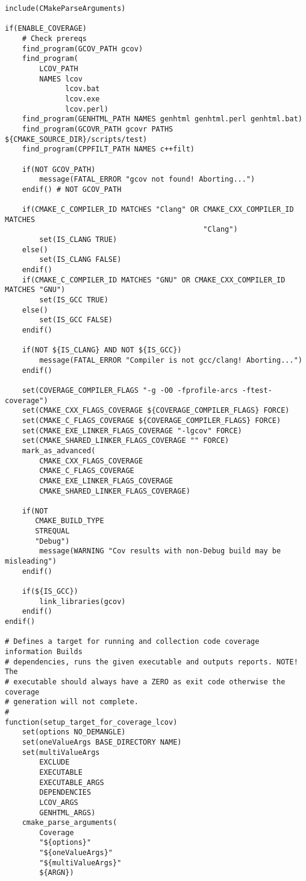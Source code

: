 \begin{verbatim}
include(CMakeParseArguments)

if(ENABLE_COVERAGE)
    # Check prereqs
    find_program(GCOV_PATH gcov)
    find_program(
        LCOV_PATH
        NAMES lcov
              lcov.bat
              lcov.exe
              lcov.perl)
    find_program(GENHTML_PATH NAMES genhtml genhtml.perl genhtml.bat)
    find_program(GCOVR_PATH gcovr PATHS ${CMAKE_SOURCE_DIR}/scripts/test)
    find_program(CPPFILT_PATH NAMES c++filt)

    if(NOT GCOV_PATH)
        message(FATAL_ERROR "gcov not found! Aborting...")
    endif() # NOT GCOV_PATH

    if(CMAKE_C_COMPILER_ID MATCHES "Clang" OR CMAKE_CXX_COMPILER_ID MATCHES
                                              "Clang")
        set(IS_CLANG TRUE)
    else()
        set(IS_CLANG FALSE)
    endif()
    if(CMAKE_C_COMPILER_ID MATCHES "GNU" OR CMAKE_CXX_COMPILER_ID MATCHES "GNU")
        set(IS_GCC TRUE)
    else()
        set(IS_GCC FALSE)
    endif()

    if(NOT ${IS_CLANG} AND NOT ${IS_GCC})
        message(FATAL_ERROR "Compiler is not gcc/clang! Aborting...")
    endif()

    set(COVERAGE_COMPILER_FLAGS "-g -O0 -fprofile-arcs -ftest-coverage")
    set(CMAKE_CXX_FLAGS_COVERAGE ${COVERAGE_COMPILER_FLAGS} FORCE)
    set(CMAKE_C_FLAGS_COVERAGE ${COVERAGE_COMPILER_FLAGS} FORCE)
    set(CMAKE_EXE_LINKER_FLAGS_COVERAGE "-lgcov" FORCE)
    set(CMAKE_SHARED_LINKER_FLAGS_COVERAGE "" FORCE)
    mark_as_advanced(
        CMAKE_CXX_FLAGS_COVERAGE
        CMAKE_C_FLAGS_COVERAGE
        CMAKE_EXE_LINKER_FLAGS_COVERAGE
        CMAKE_SHARED_LINKER_FLAGS_COVERAGE)

    if(NOT
       CMAKE_BUILD_TYPE
       STREQUAL
       "Debug")
        message(WARNING "Cov results with non-Debug build may be misleading")
    endif()

    if(${IS_GCC})
        link_libraries(gcov)
    endif()
endif()

# Defines a target for running and collection code coverage information Builds
# dependencies, runs the given executable and outputs reports. NOTE! The
# executable should always have a ZERO as exit code otherwise the coverage
# generation will not complete.
#
function(setup_target_for_coverage_lcov)
    set(options NO_DEMANGLE)
    set(oneValueArgs BASE_DIRECTORY NAME)
    set(multiValueArgs
        EXCLUDE
        EXECUTABLE
        EXECUTABLE_ARGS
        DEPENDENCIES
        LCOV_ARGS
        GENHTML_ARGS)
    cmake_parse_arguments(
        Coverage
        "${options}"
        "${oneValueArgs}"
        "${multiValueArgs}"
        ${ARGN})


\end{verbatim}

